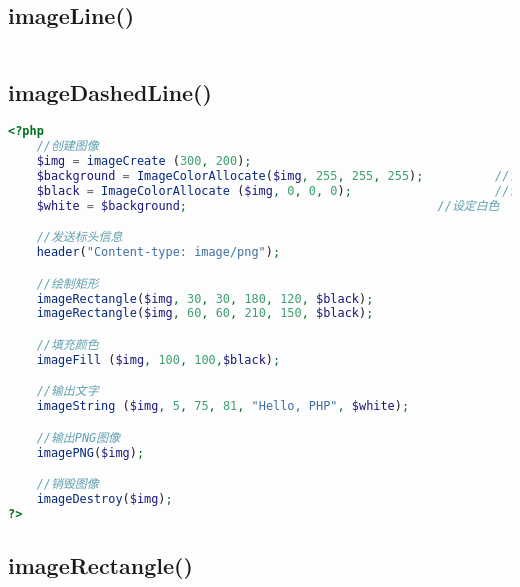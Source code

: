 \begin{lstlisting}[language=PHP]

\end{lstlisting}


\subsection{imageLine()}


\begin{lstlisting}[language=PHP]

\end{lstlisting}



\subsection{imageDashedLine()}



\begin{lstlisting}[language=PHP]
<?php
	//创建图像
	$img = imageCreate (300, 200);
	$background = ImageColorAllocate($img, 255, 255, 255);			//背景设为白色
	$black = ImageColorAllocate ($img, 0, 0, 0);		  			//设定黑色
	$white = $background;									//设定白色

	//发送标头信息
	header("Content-type: image/png");

	//绘制矩形
	imageRectangle($img, 30, 30, 180, 120, $black);
	imageRectangle($img, 60, 60, 210, 150, $black);

	//填充颜色
	imageFill ($img, 100, 100,$black);

	//输出文字
	imageString ($img, 5, 75, 81, "Hello, PHP", $white);

	//输出PNG图像
	imagePNG($img);

	//销毁图像
	imageDestroy($img);
?>
\end{lstlisting}







\subsection{imageRectangle()}




\begin{lstlisting}[language=PHP]

\end{lstlisting}



